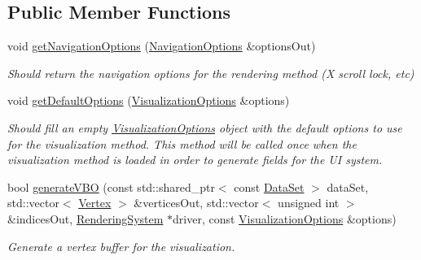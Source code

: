 \subsection*{Public Member Functions}
\begin{DoxyCompactItemize}
\item 
void \hyperlink{class_lots_of_lines_1_1_radial_paired_coordinates_visualization_method_ad7462567a3662995723e0fb11b89ea69}{get\+Navigation\+Options} (\hyperlink{struct_lots_of_lines_1_1_navigation_options}{Navigation\+Options} \&options\+Out)\hypertarget{class_lots_of_lines_1_1_radial_paired_coordinates_visualization_method_ad7462567a3662995723e0fb11b89ea69}{}\label{class_lots_of_lines_1_1_radial_paired_coordinates_visualization_method_ad7462567a3662995723e0fb11b89ea69}

\begin{DoxyCompactList}\small\item\em Should return the navigation options for the rendering method (X scroll lock, etc) \end{DoxyCompactList}\item 
void \hyperlink{class_lots_of_lines_1_1_radial_paired_coordinates_visualization_method_ae1ecc6a006aed89f4716eed79257b764}{get\+Default\+Options} (\hyperlink{class_lots_of_lines_1_1_visualization_options}{Visualization\+Options} \&options)\hypertarget{class_lots_of_lines_1_1_radial_paired_coordinates_visualization_method_ae1ecc6a006aed89f4716eed79257b764}{}\label{class_lots_of_lines_1_1_radial_paired_coordinates_visualization_method_ae1ecc6a006aed89f4716eed79257b764}

\begin{DoxyCompactList}\small\item\em Should fill an empty \hyperlink{class_lots_of_lines_1_1_visualization_options}{Visualization\+Options} object with the default options to use for the visualization method. This method will be called once when the visualization method is loaded in order to generate fields for the UI system. \end{DoxyCompactList}\item 
bool \hyperlink{class_lots_of_lines_1_1_radial_paired_coordinates_visualization_method_ae47504a4cc82235dc02ffabd26fb1657}{generate\+V\+BO} (const std\+::shared\+\_\+ptr$<$ const \hyperlink{class_lots_of_lines_1_1_data_set}{Data\+Set} $>$ data\+Set, std\+::vector$<$ \hyperlink{struct_lots_of_lines_1_1_vertex}{Vertex} $>$ \&vertices\+Out, std\+::vector$<$ unsigned int $>$ \&indices\+Out, \hyperlink{class_lots_of_lines_1_1_rendering_system}{Rendering\+System} $\ast$driver, const \hyperlink{class_lots_of_lines_1_1_visualization_options}{Visualization\+Options} \&options)\hypertarget{class_lots_of_lines_1_1_radial_paired_coordinates_visualization_method_ae47504a4cc82235dc02ffabd26fb1657}{}\label{class_lots_of_lines_1_1_radial_paired_coordinates_visualization_method_ae47504a4cc82235dc02ffabd26fb1657}

\begin{DoxyCompactList}\small\item\em Generate a vertex buffer for the visualization. \end{DoxyCompactList}\end{DoxyCompactItemize}
